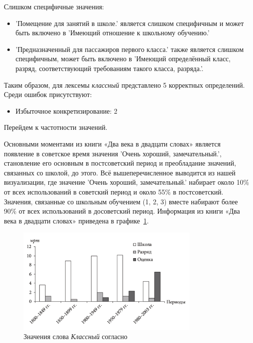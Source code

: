 Слишком специфичные значения:
\begin{itemize}
    \item ’Помещение для занятий в школе.’ является слишком специфичным
и может быть включено в ’Имеющий отношение к школьному обучению.’

    \item ’Предназначенный для пассажиров первого класса.’ также является слишком специфичным,
может быть включено в ’Имеющий определённый класс, разряд, соответствующий требованиям такого класса, разряда.’.
\end{itemize}

Таким образом, для лексемы \textit{классный} представлено 5 корректных определений.
Среди ошибок присутствуют:
\begin{itemize}
    \item Избыточное конкретизирование: 2
\end{itemize}

Перейдем к частотности значений.

Основными моментами из книги «Два века в двадцати словах» является появление
в советское время значения ’Очень хороший, замечательный.’,
становление его основным в постсоветский период и
преобладание значений, связанных со школой, до этого.
Всё вышеперечисленное выводится из нашей визуализации,
где значение ’Очень хороший, замечательный.’ набирает около 10\% от всех
использований в советский период и около 55\% в постсоветский.
Значения, связанные со школьным обучением (1, 2, 3) вместе набирают
более 90\% от всех использований в досоветский период.
Информация из книги «Два века в двадцати словах» приведена в графике~\ref{fig:TwoCenturiesKlassnij}.

\begin{figure}[H]
    \centering %
    \includegraphics[width=0.8\textwidth]{img/book/klassnij/all}
    \caption{Значения слова \textit{Классный} согласно~\cite{TwoCenturies}}
    \label{fig:TwoCenturiesKlassnij}
\end{figure}

